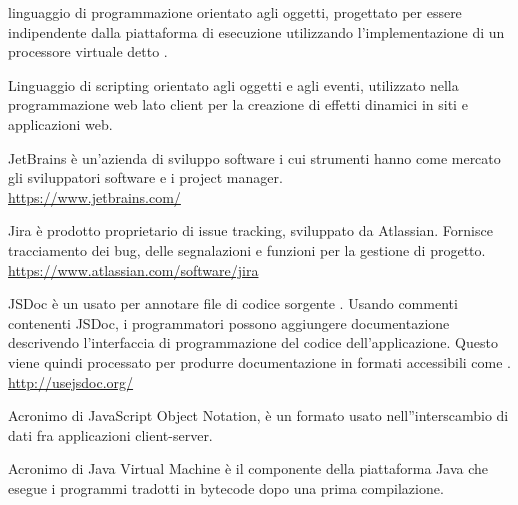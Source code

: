 linguaggio di programmazione orientato agli oggetti, progettato per essere indipendente dalla piattaforma di esecuzione utilizzando l'implementazione di un processore virtuale detto .

Linguaggio di scripting orientato agli oggetti e agli eventi, utilizzato nella programmazione web lato client per la creazione di effetti dinamici in siti e applicazioni web.

JetBrains è un'azienda di sviluppo software i cui strumenti hanno come mercato gli sviluppatori software e i project manager.\\
\url{https://www.jetbrains.com/}

Jira è prodotto proprietario di issue tracking, sviluppato da Atlassian. Fornisce tracciamento dei bug, delle segnalazioni e funzioni per la gestione di progetto.\\
\url{https://www.atlassian.com/software/jira}

JSDoc è un  usato per annotare file di codice sorgente . Usando commenti contenenti JSDoc, i programmatori possono aggiungere documentazione descrivendo l’interfaccia di programmazione del codice dell’applicazione. Questo viene quindi processato per produrre documentazione in formati accessibili come .\\
\url{http://usejsdoc.org/}

Acronimo di JavaScript Object Notation, \`e un formato usato nell''interscambio di dati fra applicazioni client-server.

Acronimo di Java Virtual Machine \`e il componente della piattaforma Java che esegue i programmi tradotti in bytecode dopo una prima compilazione.
\clearpage